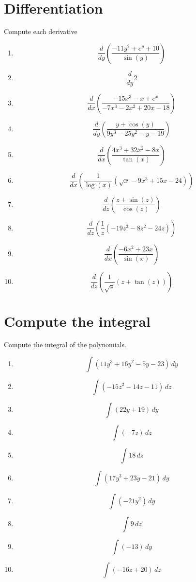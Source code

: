 \documentclass{article}
\begin{document}
        \section{Differentiation}
        Compute each derivative
        \begin{multicols}{1}
        \begin{enumerate}
        \item $$\frac{d}{d y}\left(\frac{- 11 y^{2} + e^{y} + 10}{\sin{\left (y \right )}}\right)$$
\item $$\frac{d}{d y} 2$$
\item $$\frac{d}{d x}\left(\frac{- 15 x^{3} - x + e^{x}}{- 7 x^{3} - 2 x^{2} + 20 x - 18}\right)$$
\item $$\frac{d}{d y}\left(\frac{y + \cos{\left (y \right )}}{9 y^{3} - 25 y^{2} - y - 19}\right)$$
\item $$\frac{d}{d x}\left(\frac{4 x^{3} + 32 x^{2} - 8 x}{\tan{\left (x \right )}}\right)$$
\item $$\frac{d}{d x}\left(\frac{1}{\log{\left (x \right )}} \left(\sqrt{x} - 9 x^{3} + 15 x - 24\right)\right)$$
\item $$\frac{d}{d z}\left(\frac{z + \sin{\left (z \right )}}{\cos{\left (z \right )}}\right)$$
\item $$\frac{d}{d z}\left(\frac{1}{z} \left(- 19 z^{3} - 8 z^{2} - 24 z\right)\right)$$
\item $$\frac{d}{d x}\left(\frac{- 6 x^{2} + 23 x}{\sin{\left (x \right )}}\right)$$
\item $$\frac{d}{d z}\left(\frac{1}{\sqrt{z}} \left(z + \tan{\left (z \right )}\right)\right)$$
        \end{enumerate}
        \end{multicols}
        

        \section{Compute the integral}
        Compute the integral of the polynomials.
        \begin{multicols}{1}
        \begin{enumerate}
        \item $$\int \left(11 y^{3} + 16 y^{2} - 5 y - 23\right)\, dy$$
\item $$\int \left(- 15 z^{2} - 14 z - 11\right)\, dz$$
\item $$\int \left(22 y + 19\right)\, dy$$
\item $$\int \left(- 7 z\right)\, dz$$
\item $$\int 18\, dz$$
\item $$\int \left(17 y^{3} + 23 y - 21\right)\, dy$$
\item $$\int \left(- 21 y^{2}\right)\, dy$$
\item $$\int 9\, dz$$
\item $$\int \left(-13\right)\, dy$$
\item $$\int \left(- 16 z + 20\right)\, dz$$
        \end{enumerate}
        \end{multicols}
        
\end{document}
